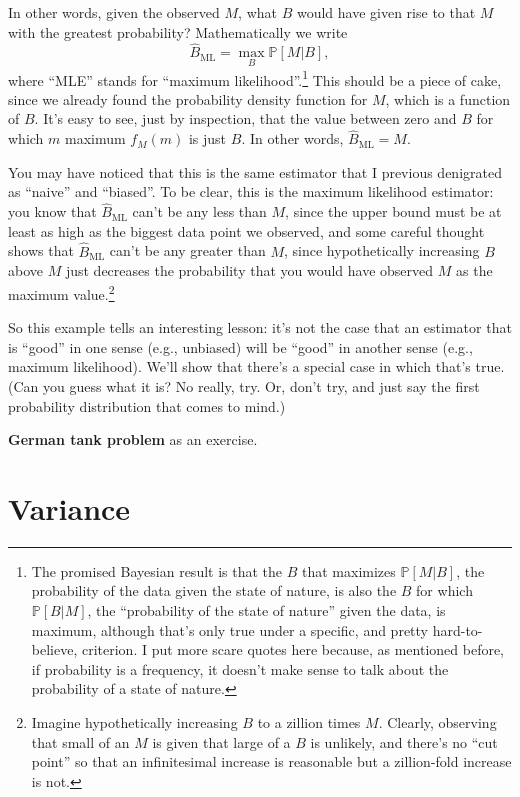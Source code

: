In other words, given the observed \(M\), what \(B\) would have given
rise to that \(M\) with the greatest probability? Mathematically we
write \[
\hat{B}_\mathrm{ML} = \max_B \mathbb{P}[M | B],
\] where ``MLE'' stands for ``maximum likelihood''.\footnote{The
  promised Bayesian result is that the \(B\) that maximizes
  \(\mathbb{P}[M | B]\), the probability of the data given the state of
  nature, is also the \(B\) for which \(\mathbb{P}[B | M]\), the
  ``probability of the state of nature'' given the data, is maximum,
  although that's only true under a specific, and pretty
  hard-to-believe, criterion. I put more scare quotes here because, as
  mentioned before, if probability is a frequency, it doesn't make sense
  to talk about the probability of a state of nature.} This should be a
piece of cake, since we already found the probability density function
for \(M\), which is a function of \(B\). It's easy to see, just by
inspection, that the value between zero and \(B\) for which \(m\)
maximum \(f_M(m)\) is just \(B\). In other words,
\(\hat{B}_\mathrm{ML} = M\).

You may have noticed that this is the same estimator that I previous
denigrated as ``naive'' and ``biased''. To be clear, this is the maximum
likelihood estimator: you know that \(\hat{B}_\mathrm{ML}\) can't be any
less than \(M\), since the upper bound must be at least as high as the
biggest data point we observed, and some careful thought shows that
\(\hat{B}_\mathrm{ML}\) can't be any greater than \(M\), since
hypothetically increasing \(B\) above \(M\) just decreases the
probability that you would have observed \(M\) as the maximum
value.\footnote{Imagine hypothetically increasing \(B\) to a zillion
  times \(M\). Clearly, observing that small of an \(M\) is given that
  large of a \(B\) is unlikely, and there's no ``cut point'' so that an
  infinitesimal increase is reasonable but a zillion-fold increase is
  not.}

So this example tells an interesting lesson: it's not the case that an
estimator that is ``good'' in one sense (e.g., unbiased) will be
``good'' in another sense (e.g., maximum likelihood). We'll show that
there's a special case in which that's true. (Can you guess what it is?
No really, try. Or, don't try, and just say the first probability
distribution that comes to mind.)

\textbf{German tank problem} as an exercise.

\section{Variance}\label{variance}

